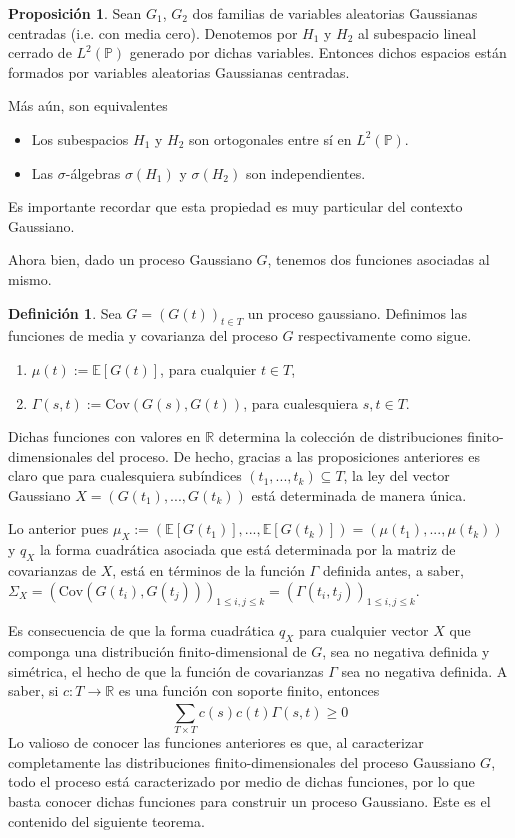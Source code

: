 \documentclass[letterpaper,twoside]{book}
\newcommand{\R}{\mathbb{R}}
\newcommand{\E}{\mathbb{E}}
\renewcommand{\P}{\mathbb{P}}
\newcommand{\1}{\mathds{1}}
\renewcommand{\to}{\rightarrow}
\theoremstyle{definition}
\newtheorem{dfn}{Definición}
\theoremstyle{definition}
\theoremstyle{definition}
\theoremstyle{definition}
\newtheorem{prop}{Proposición}
\theoremstyle{definition}
\theoremstyle{definition}
\theoremstyle{definition}
\begin{document}
\begin{prop}\label{Gaussi_indep} 
 Sean $G_1$, $G_2$ dos familias de variables aleatorias Gaussianas centradas (i.e. con media cero). Denotemos por $H_1$ y $H_2$ al subespacio lineal cerrado de $L^{2}(\P)$ generado por dichas variables. Entonces dichos espacios están formados por variables aleatorias Gaussianas centradas.

 Más aún, son equivalentes 
 \begin{itemize}
    \item Los subespacios $H_1$ y $H_2$ son ortogonales entre sí en $L^{2}(\P)$.
    \item Las $\sigma$-álgebras $\sigma(H_1)$ y $\sigma(H_2)$ son independientes.
 \end{itemize}
 Es importante recordar que esta propiedad es muy particular del contexto Gaussiano.
 \end{prop}
Ahora bien, dado un proceso Gaussiano $G$, tenemos dos funciones asociadas al mismo.
\begin{dfn} 
 Sea $G=(G(t))_{t\in T}$ un proceso gaussiano. Definimos las funciones de media y covarianza del proceso $G$ respectivamente como sigue.
 \begin{enumerate}
    \item $\mu(t):=\E\left[G(t)\right]$, \qquad para cualquier $t\in T$,
    \item $\Gamma(s,t):= \text{Cov}\left(G(s),G(t)\right)$, \qquad para cualesquiera $s,t\in T$.
 \end{enumerate}
 \end{dfn}
Dichas funciones con valores en $\R$ determina la colección de distribuciones finito-dimensionales del proceso. 
De hecho, gracias a las proposiciones anteriores es claro que para cualesquiera subíndices $(t_1,...,t_k)\subseteq T$, la ley del vector Gaussiano $X=(G(t_1),...,G(t_k))$ está determinada de manera única. 

Lo anterior pues $\mu_X:=(\E\left[G(t_1)\right],...,\E\left[G(t_k)\right])=(\mu(t_1),...,\mu(t_k))$ y $q_X$ la forma cuadrática asociada que está determinada por la matriz de covarianzas de $X$, está en términos de la función $\Gamma$ definida antes, a saber, $\Sigma_X=\left(\text{Cov}\left(G(t_i),G(t_j)\right)\right)_{1\leq i,j\le k}=\left(\Gamma(t_i,t_j)\right)_{1\le i,j\le k }$.

Es consecuencia de que la forma cuadrática $q_X$ para cualquier vector $X$ que componga una distribución finito-dimensional de $G$, sea no negativa definida y simétrica, el hecho de que la función de covarianzas $\Gamma$ sea no negativa definida. A saber, si $c:T\to \R$ es una función con soporte finito, entonces 
\[  
    \sum_{T\times T}^{}c(s)c(t)\Gamma(s,t)\geq0
\]
Lo valioso de conocer las funciones anteriores es que, al caracterizar completamente las distribuciones finito-dimensionales del proceso Gaussiano $G$, todo el proceso está caracterizado por medio de dichas funciones, por lo que basta conocer dichas funciones para construir un proceso Gaussiano. Este es el contenido del siguiente teorema.
\end{document}
